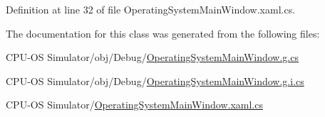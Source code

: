Definition at line 32 of file Operating\+System\+Main\+Window.\+xaml.\+cs.



The documentation for this class was generated from the following files\+:\begin{DoxyCompactItemize}
\item 
C\+P\+U-\/\+O\+S Simulator/obj/\+Debug/\hyperlink{_debug_2_operating_system_main_window_8g_8cs}{Operating\+System\+Main\+Window.\+g.\+cs}\item 
C\+P\+U-\/\+O\+S Simulator/obj/\+Debug/\hyperlink{_debug_2_operating_system_main_window_8g_8i_8cs}{Operating\+System\+Main\+Window.\+g.\+i.\+cs}\item 
C\+P\+U-\/\+O\+S Simulator/\hyperlink{_operating_system_main_window_8xaml_8cs}{Operating\+System\+Main\+Window.\+xaml.\+cs}\end{DoxyCompactItemize}
